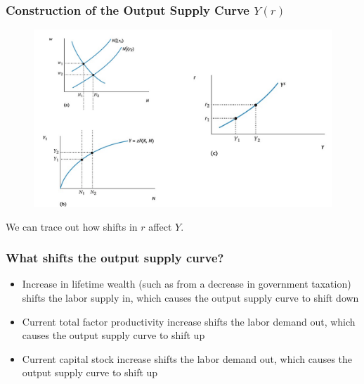\documentclass{beamer}
\begin{document}
\begin{frame}
\frametitle[alignment=center]{Construction of the Output Supply Curve $Y(r)$} 
\begin{figure}
\centering
\includegraphics[scale=0.3]{Figures/W_Fig_11pt15.png}
\end{figure}
We can trace out how shifts in $r$ affect $Y$.  
\end{frame}

\begin{frame}
\frametitle[alignment=center]{What shifts the output supply curve?}
\begin{itemize}
\item Increase in lifetime wealth (such as from a decrease in government taxation) shifts the labor supply in, which causes the output supply curve to shift down
\bigskip
\item Current total factor productivity increase shifts the labor demand out, which causes the output supply curve to shift up 
\bigskip
\item Current capital stock increase shifts the labor demand out, which causes the output supply curve to shift up 
\end{itemize} 
\end{frame}
\end{document}
